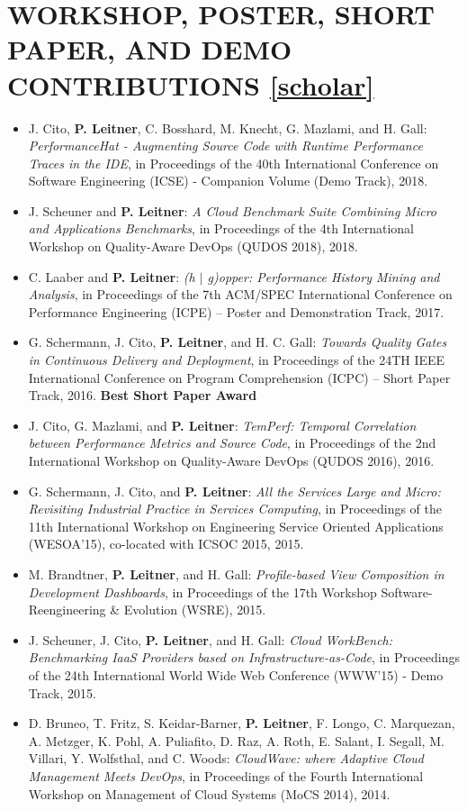 \documentclass[paper=letter,fontsize=11pt]{scrartcl} %
\newcommand{\NewPart}[2]{\section*{\uppercase{#1} #2}}
\begin{document}
\NewPart{Workshop, Poster, Short Paper, and Demo Contributions}{\href{https://scholar.google.ch/citations?user=wZ9f8CAAAAAJ}{[scholar]}}

\begin{itemize}
	\item J. Cito, \textbf{P. Leitner}, C. Bosshard, M. Knecht, G. Mazlami, and H. Gall: \emph{PerformanceHat - Augmenting Source Code with Runtime Performance Traces in the IDE}, in Proceedings of the 40th International Conference on Software Engineering (ICSE) - Companion Volume (Demo Track), 2018.
	\item J. Scheuner and \textbf{P. Leitner}: \emph{A Cloud Benchmark Suite Combining Micro and Applications Benchmarks}, in Proceedings of the 4th International Workshop on Quality-Aware DevOps (QUDOS 2018), 2018.
	\item C. Laaber and \textbf{P. Leitner}: \emph{ (h $|$ g)opper: Performance History Mining and Analysis},  in Proceedings of the 7th ACM/SPEC International Conference on Performance Engineering (ICPE) -- Poster and Demonstration Track, 2017.
	\item G. Schermann, J. Cito, \textbf{P. Leitner}, and H. C. Gall: \emph{Towards Quality Gates in Continuous Delivery and Deployment}, in Proceedings of the 24TH IEEE International Conference on Program Comprehension (ICPC) – Short Paper Track, 2016. \textbf{Best Short Paper Award}
	\item J. Cito, G. Mazlami, and \textbf{P. Leitner}: \emph{TemPerf: Temporal Correlation between Performance Metrics and Source Code}, in Proceedings of the 2nd International Workshop on Quality-Aware DevOps (QUDOS 2016), 2016.
    \item G. Schermann, J. Cito, and \textbf{P. Leitner}: \emph{All the Services Large and Micro: Revisiting Industrial Practice in Services Computing}, in Proceedings of the 11th International Workshop on Engineering Service Oriented Applications (WESOA’15), co-located with ICSOC 2015, 2015.
    \item M. Brandtner, \textbf{P. Leitner}, and H. Gall: \emph{Profile-based View Composition in Development Dashboards}, in Proceedings of the 17th Workshop Software-Reengineering \& Evolution (WSRE), 2015.
  \item J. Scheuner, J. Cito, \textbf{P. Leitner}, and H. Gall: \emph{Cloud WorkBench: Benchmarking IaaS Providers based on Infrastructure-as-Code}, in Proceedings of the 24th International World Wide Web Conference (WWW'15) - Demo Track, 2015.
 \item D. Bruneo, T. Fritz, S. Keidar-Barner, \textbf{P. Leitner}, F. Longo, C. Marquezan, A. Metzger, K. Pohl, A. Puliafito, D. Raz, A. Roth, E. Salant, I. Segall, M. Villari, Y. Wolfsthal, and C. Woods: \emph{CloudWave: where Adaptive Cloud Management Meets DevOps}, in Proceedings of the Fourth International Workshop on Management of Cloud Systems (MoCS 2014), 2014.

\end{itemize}
\end{document}
